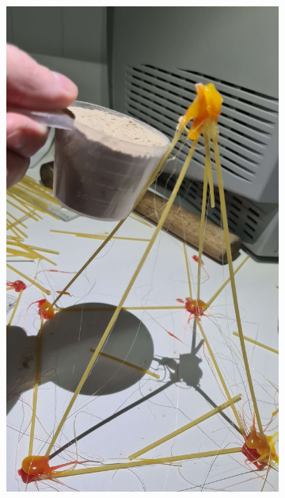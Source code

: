 \documentclass{report}
\begin{document}
\begin{figure}[ht]
	\begin{subfigure}{.5\textwidth}
		\centering
		\includegraphics[width=.7\linewidth]{pyramid-a}


\end{subfigure}
\end{figure}
\end{document}
